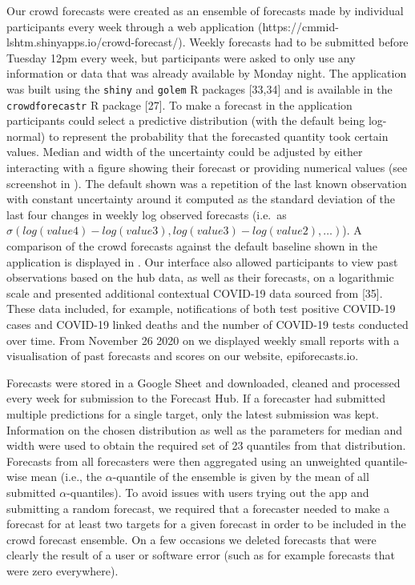 \documentclass[10pt,letterpaper]{article}
\begin{document}
Our crowd forecasts were created as an ensemble of forecasts made by
individual participants every week through a web application
(https://cmmid-lshtm.shinyapps.io/crowd-forecast/). Weekly forecasts had
to be submitted before Tuesday 12pm every week, but participants were
asked to only use any information or data that was already available by
Monday night. The application was built using the \texttt{shiny} and
\texttt{golem} R packages {[}33,34{]} and is available in the
\texttt{crowdforecastr} R package {[}27{]}. To make a forecast in the
application participants could select a predictive distribution (with
the default being log-normal) to represent the probability that the
forecasted quantity took certain values. Median and width of the
uncertainty could be adjusted by either interacting with a figure
showing their forecast or providing numerical values (see screenshot in
). The default shown was a repetition of the
last known observation with constant uncertainty around it computed as
the standard deviation of the last four changes in weekly log observed
forecasts (i.e.~as
\(\sigma(log(value4) - log(value3), log(value3) - log(value2), \ldots )\)).
A comparison of the crowd forecasts against the default baseline shown
in the application is displayed in .
Our interface also allowed participants to view past observations based
on the hub data, as well as their forecasts, on a logarithmic scale and
presented additional contextual COVID-19 data sourced from {[}35{]}.
These data included, for example, notifications of both test positive
COVID-19 cases and COVID-19 linked deaths and the number of COVID-19
tests conducted over time. From November 26 2020 on we displayed weekly
small reports with a visualisation of past forecasts and scores on our
website, epiforecasts.io.

Forecasts were stored in a Google Sheet and downloaded, cleaned and
processed every week for submission to the Forecast Hub. If a forecaster
had submitted multiple predictions for a single target, only the latest
submission was kept. Information on the chosen distribution as well as
the parameters for median and width were used to obtain the required set
of 23 quantiles from that distribution. Forecasts from all forecasters
were then aggregated using an unweighted quantile-wise mean (i.e., the
\(\alpha\)-quantile of the ensemble is given by the mean of all
submitted \(\alpha\)-quantiles). To avoid issues with users trying out
the app and submitting a random forecast, we required that a forecaster
needed to make a forecast for at least two targets for a given forecast
in order to be included in the crowd forecast ensemble. On a few
occasions we deleted forecasts that were clearly the result of a user or
software error (such as for example forecasts that were zero
everywhere).
\end{document}

